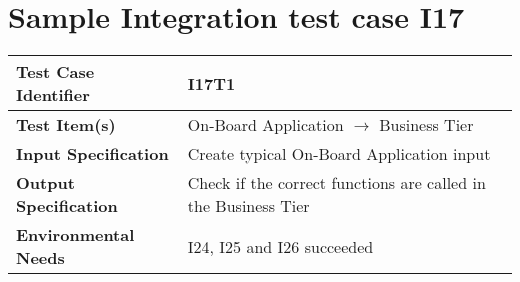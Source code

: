 \section{Sample Integration test case I17}\label{I17}
\begin{center}
	\vspace{0.6cm}
	\begin{tabular}{|l|l|}
		\hline
		\textbf{Test Case Identifier} & I17T1 \bigstrut \\\hline
		\textbf{Test Item(s)} & On-Board Application \ensuremath{\rightarrow} Business Tier \bigstrut \\\hline
		\textbf{Input Specification} & Create typical On-Board Application input \bigstrut \\\hline
		\textbf{Output Specification} & Check if the correct functions are called in the Business Tier \bigstrut \\\hline
		\textbf{Environmental Needs} & I24, I25 and I26 succeeded \bigstrut \\\hline
	\end{tabular}
\end{center}